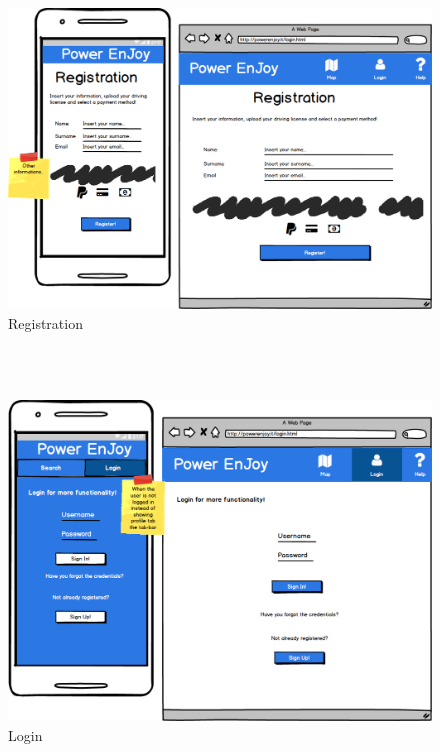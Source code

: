 \begin{center}
\begin{figure}[H]
\includegraphics[scale=0.3]{Mockup/Register}

\caption{Registration}

\end{figure}
\\
\\
\begin{figure}[H]
\includegraphics[scale=0.3]{Mockup/Login}

\caption{Login}

\end{figure}
\\
\\
\par\end{center}

